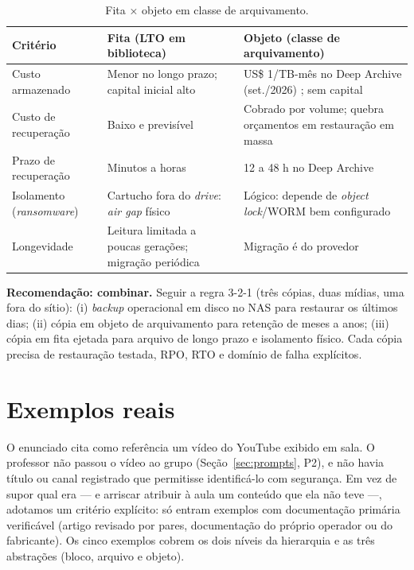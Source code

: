 \documentclass[11pt,a4paper]{article}
\begin{document}
\begin{table}[H]
\centering
\caption{Fita × objeto em classe de arquivamento.}
\label{tab:recter}
{\footnotesize
\begin{tabular}{@{}L{3.0cm}L{5.8cm}L{6.0cm}@{}}
\toprule
\textbf{Critério} & \textbf{Fita (LTO em biblioteca)} & \textbf{Objeto (classe de arquivamento)} \\
\midrule
Custo armazenado & Menor no longo prazo; capital inicial alto & US\$ 1/TB-mês no Deep Archive (set./2026) \cite{awsglacier}; sem capital \\
Custo de recuperação & Baixo e previsível & Cobrado por volume; quebra orçamentos em restauração em massa \\
Prazo de recuperação & Minutos a horas & 12 a 48 h no Deep Archive \cite{awsglacier} \\
Isolamento (\textit{ransomware}) & Cartucho fora do \textit{drive}: \textit{air gap} físico & Lógico: depende de \textit{object lock}/WORM bem configurado \\
Longevidade & Leitura limitada a poucas gerações; migração periódica & Migração é do provedor \\
\bottomrule
\end{tabular}}
\end{table}

\textbf{Recomendação: combinar.} Seguir a regra 3-2-1 (três cópias, duas mídias, uma fora do sítio): (i)
\textit{backup} operacional em disco no NAS para restaurar os últimos dias; (ii) cópia em objeto de
arquivamento para retenção de meses a anos; (iii) cópia em fita ejetada para arquivo de longo prazo e
isolamento físico. Cada cópia precisa de restauração testada, RPO, RTO e domínio de falha explícitos.

\section{Exemplos reais}
\label{sec:exemplos}

O enunciado cita como referência um vídeo do YouTube exibido em sala. O professor não passou o vídeo ao
grupo (Seção~\ref{sec:prompts}, P2), e não havia título ou canal registrado que permitisse identificá-lo com
segurança. Em vez de supor qual era --- e arriscar atribuir à aula um conteúdo que ela não teve ---,
adotamos um critério explícito: só entram exemplos com documentação primária verificável (artigo revisado
por pares, documentação do próprio operador ou do fabricante). Os cinco exemplos cobrem os dois níveis
da hierarquia e as três abstrações (bloco, arquivo e objeto).
\end{document}
